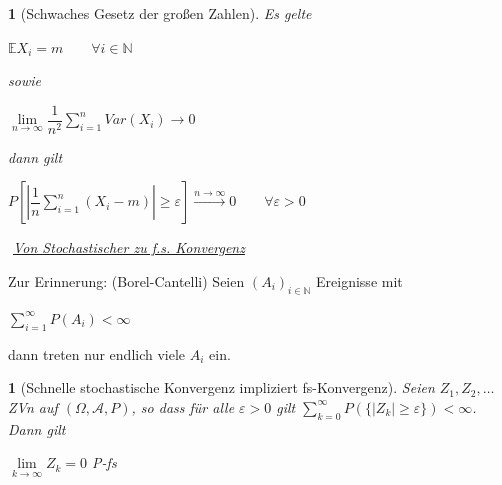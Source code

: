 \documentclass[10pt,a4paper]{report}
\numberwithin{equation}{section}
\numberwithin{figure}{section}
\theoremstyle{plain}
\theoremstyle{definition}
\theoremstyle{remark}
\theoremstyle{plain}
\newtheorem{lem}[thm]{\protect\lemmaname}
\newtheorem{prop}[thm]{\protect\propositionname}
\providecommand{\lemmaname}{Lemma}
\providecommand{\propositionname}{Satz}
\newcommand{\1}{ \mathbb{1} } %
\begin{document}
\begin{prop}[Schwaches Gesetz der großen Zahlen] 
  Es gelte
  \begin{center}
    $\mathbb{E}X_i=m\qquad \forall i \in \mathbb{N}$
  \end{center}
  sowie
  \begin{center}
    $\lim\limits_{n \to \infty}
    \dfrac{1}{n^2}\sum\limits_{i=1}^nVar(X_i) \to 0$
  \end{center}
  dann gilt
  \begin{center}
    $P\left[\left|\dfrac{1}{n}\sum\limits_{i=1}^n(X_i-m)\right|\geq
      \varepsilon\right] \overset{n \to \infty}{\to} 0 \qquad \forall
    \varepsilon >0$
  \end{center}
  $ $
  \underline{Von Stochastischer zu f.s. Konvergenz}
\end{prop}
Zur Erinnerung: (Borel-Cantelli) Seien $(A_i)_{i \in \mathbb{N}}$ Ereignisse mit
\begin{center}
$\sum\limits_{i=1}^\infty P(A_i) < \infty $
\end{center} 
dann treten nur endlich viele $A_i$ ein.
\begin{lem}[Schnelle stochastische Konvergenz impliziert fs-Konvergenz] 
  Seien $Z_1, Z_2,\ldots$ ZVn auf $(\Omega,\mathcal{A},P)$, so dass
  für alle $\varepsilon >0$ gilt $\sum\limits_{k=0}^\infty P(\{|Z_k|\geq
  \varepsilon\})< \infty $. Dann gilt
  \begin{center}
    $\lim\limits_{k \to \infty} Z_k=0$ P-fs
  \end{center}
\end{lem}
\end{document}
